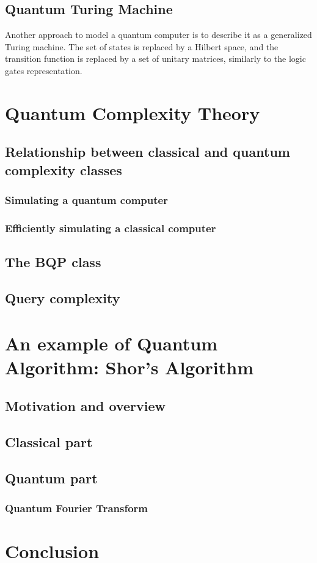 \documentclass[12pt,a4paper]{article}
\begin{document}
\subsection{Quantum Turing Machine}
Another approach to model a quantum computer is to describe it as a generalized Turing machine. The set of states is replaced by a Hilbert space, and the transition function is replaced by a set of unitary matrices, similarly to the logic gates representation. 

\section{Quantum Complexity Theory}
\subsection{Relationship between classical and quantum complexity classes}
\subsubsection{Simulating a quantum computer}
\subsubsection{Efficiently simulating a classical computer}

\subsection{The BQP class}
\subsection{Query complexity}

\section{An example of Quantum Algorithm: Shor's Algorithm}
\subsection{Motivation and overview}
\subsection{Classical part}
\subsection{Quantum part}
\subsubsection{Quantum Fourier Transform}

\section*{Conclusion}
\end{document}
